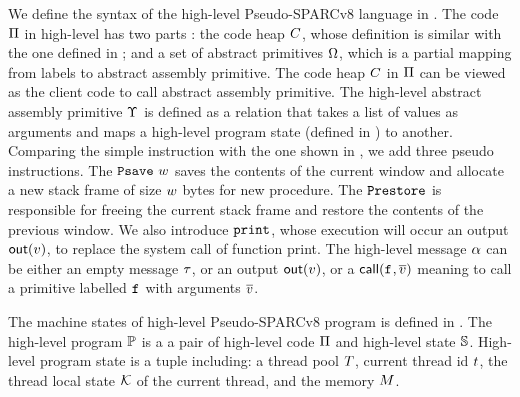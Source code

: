 We define the syntax of the high-level Pseudo-SPARCv8 language 
in \Fig{\ref{fig:syntax-of-concur-pseudo-sparc}}. 
The code $\Pi$ in high-level has two parts : 
the code heap $C$, whose definition is similar with  
the one defined 
in \Fig{\ref{fig:Machine States and Language for SPARC Code}}; 
and a set of abstract primitives $\Omega$, 
which is a partial mapping from labels to 
abstract assembly primitive. The code heap $C$ in $\Pi$ 
can be viewed as the client code to 
call abstract assembly primitive. 
The high-level abstract assembly primitive $\Upsilon$ 
is defined as a relation that takes a list of values 
as arguments and maps a high-level program state 
(defined in \Fig{\ref{fig:machine-state-concur-pseudo-sparc}}) 
to another. 
Comparing the simple instruction with the one shown in 
\Fig{\ref{fig:Machine States and Language for SPARC Code}}, 
we add three pseudo instructions. The $\texttt{Psave} \ w$ 
saves the contents of the current window and 
allocate a new stack frame of size $w$ bytes for new procedure. 
The $\texttt{Prestore}$ is responsible for 
freeing the current stack frame and 
restore the contents of the previous window. 
We also introduce $\texttt{print}$, 
whose execution will occur an output $\textsf{out}({v})$, 
to replace the system call of function print. 
The high-level message 
$\alpha$ can be either an empty message $\tau$, or an output 
$\textsf{out}({v})$, or a $\textsf{call}({\texttt{f}_{}, \overline{v}})$ meaning to 
call a primitive labelled $\texttt{f}_{}$ with arguments $\overline{v}$. 

The machine states of high-level Pseudo-SPARCv8 program 
is defined in \Fig{\ref{fig:machine-state-concur-pseudo-sparc}}. 
The high-level program $\mathbb{P}$ is a a pair of high-level code 
$\Pi$ and high-level state $\mathbb{S}$. High-level program 
state is a tuple including: a thread pool $T$, 
current thread id $t$, the thread local state 
$\mathcal{K}$ of the current thread, and the memory $M$.

